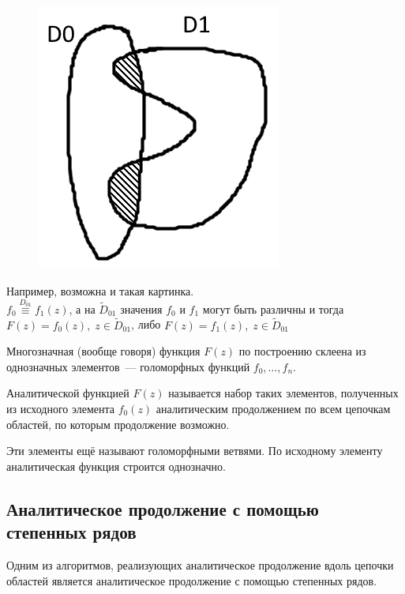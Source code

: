 \documentclass[a4paper, 12pt]{report}
\begin{document}
\begin{figure}
    \includegraphics[scale=0.2]{1 (1).png}
\end{figure}
Например, возможна и такая картинка.\\
$f_0 \overset{D_{01}}{\equiv} f_1(z)$, а на $\widetilde{D}_{01}$ значения $f_0$ и $f_1$ могут быть различны и тогда $F(z)=f_0(z), \; z \in \widetilde{D}_{01}$, либо $F(z)=f_1(z), \; z \in \widetilde{D}_{01}$

Многозначная (вообще говоря) функция $F(z)$ по построению склеена из однозначных элементов~--- голоморфных функций $f_0, \dotsc, f_n$.

Аналитической функцией $F(z)$ называется набор таких элементов, полученных из исходного элемента $f_0(z)$ аналитическим продолжением по всем цепочкам областей, по которым продолжение возможно.

Эти элементы ещё называют голоморфными ветвями. По исходному элементу аналитическая функция строится однозначно.

\subsection{Аналитическое продолжение с помощью степенных рядов}
Одним из алгоритмов, реализующих аналитическое продолжение вдоль цепочки областей является аналитическое продолжение с помощью степенных рядов.
\end{document}

